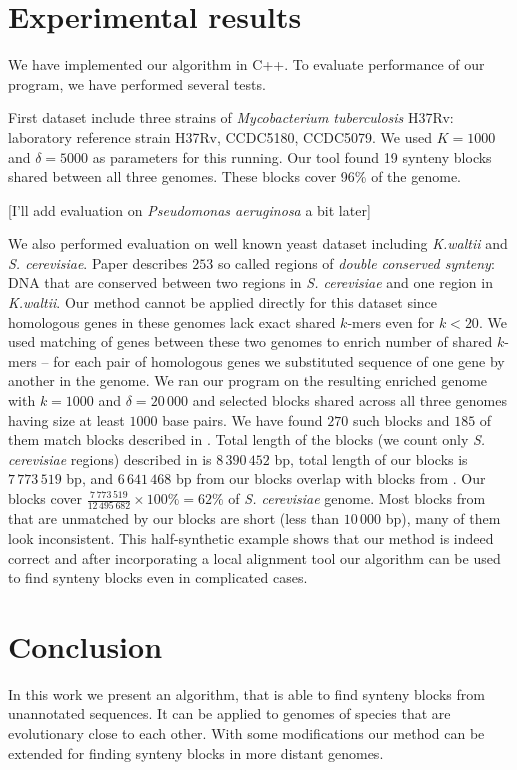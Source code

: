 \documentclass[a4paper, 12pt]{scrartcl}
\begin{document}
\section{Experimental results}
We have implemented our algorithm in C++. To evaluate performance of our program, we have performed several tests.

First dataset include three strains of \textit{Mycobacterium tuberculosis} H37Rv: laboratory reference strain H37Rv,
CCDC5180, CCDC5079. We used \(K = 1000\) and \(\delta = 5000\) as parameters for this running. Our tool found
19 synteny blocks shared between all three genomes. These blocks cover 96\% of the genome.

[I'll add evaluation on \textit{Pseudomonas aeruginosa} a bit later]

We also performed evaluation on well known yeast dataset including \textit{K.waltii} and \textit{S. cerevisiae}. Paper \cite{Kellis2004} describes
\(253\) so called regions of \textit{double conserved synteny}: DNA that are conserved between two regions in \textit{S. cerevisiae} and one region in \textit{K.waltii}.
Our method cannot be applied directly for this dataset since homologous genes in these genomes lack exact shared \(k\)-mers even for \(k < 20\). We used
matching of genes between these two genomes to enrich number of shared \(k\)-mers -- for each pair of homologous genes we substituted sequence of one
gene by another in the genome. We ran our program on the resulting enriched genome with \(k = 1000\) and \(\delta = 20 \,000\) and selected blocks shared
across all three genomes having size at least \(1 000\) base pairs. We have found \(270\) such blocks and \(185\) of them match blocks described in \cite{Kellis2004}.
Total length of the blocks (we count only \textit{S. cerevisiae} regions) described in \cite{Kellis2004} is \(8  \, 390  \, 452\) bp, total length of our blocks is \(7 \, 773 \, 519\) bp, and \(6 \, 641 \, 468\) bp
from our blocks overlap with blocks from \cite{Kellis2004}. Our blocks cover  \(\frac{7 \, 773 \, 519}{12 \, 495 \, 682} \times 100 \% = 62\% \) of \textit{S. cerevisiae} genome. Most
blocks from \cite{Kellis2004} that are unmatched by our blocks are short (less than \(10 \, 000\) bp), many of them look inconsistent. This half-synthetic example shows that
our method is indeed correct and after incorporating a local alignment tool our algorithm can be used to find synteny blocks even in complicated cases.


\section{Conclusion}
In this work we present an algorithm, that is able to find synteny blocks from unannotated sequences. It can be applied to genomes of species that are evolutionary close to each other.
With some modifications our method can be extended for finding synteny blocks in more distant genomes.
\end{document}
